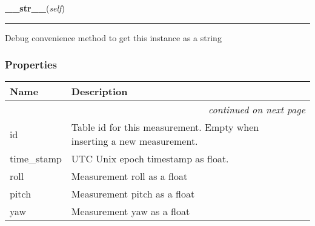     \label{src:dao:model:incoming_state:incoming_state:__str__}

    \vspace{0.5ex}

\hspace{.8\funcindent}\begin{boxedminipage}{\funcwidth}

    \raggedright \textbf{\_\_str\_\_}(\textit{self})

    \vspace{-1.5ex}

    \rule{\textwidth}{0.5\fboxrule}
\setlength{\parskip}{2ex}
    Debug convenience method to get this instance as a string

\setlength{\parskip}{1ex}
    \end{boxedminipage}



  \subsubsection{Properties}

    \vspace{-1cm}
\hspace{\varindent}\begin{longtable}{|p{\varnamewidth}|p{\vardescrwidth}|l}
\cline{1-2}
\cline{1-2} \centering \textbf{Name} & \centering \textbf{Description}& \\
\cline{1-2}
\endhead\cline{1-2}\multicolumn{3}{r}{\small\textit{continued on next page}}\\\endfoot\cline{1-2}
\endlastfoot\raggedright i\-d\- & \raggedright Table id for this measurement. Empty when inserting a new 
          measurement.&\\
\cline{1-2}
\raggedright t\-i\-m\-e\-\_\-s\-t\-a\-m\-p\- & \raggedright UTC Unix epoch timestamp as float.&\\
\cline{1-2}
\raggedright r\-o\-l\-l\- & \raggedright Measurement roll as a float&\\
\cline{1-2}
\raggedright p\-i\-t\-c\-h\- & \raggedright Measurement pitch as a float&\\
\cline{1-2}
\raggedright y\-a\-w\- & \raggedright Measurement yaw as a float&\\
\cline{1-2}
\end{longtable}


